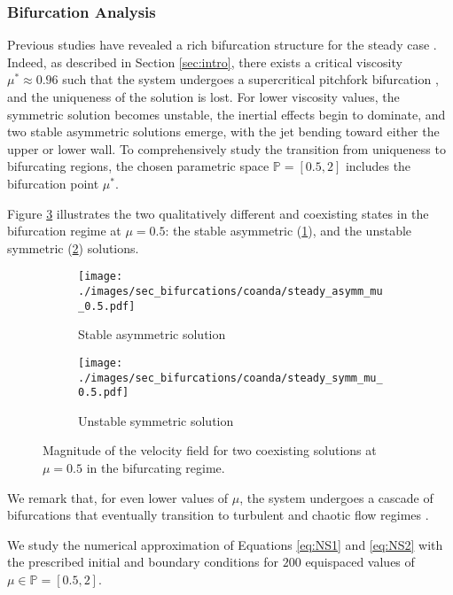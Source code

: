 \documentclass[reqno]{amsart}[standalone]
\theoremstyle{definition}
\theoremstyle{remark}
\begin{document}
\subsubsection{Bifurcation Analysis}
Previous studies have revealed a rich bifurcation structure for the steady case \parencite{QUAINI, pintore_2021}. Indeed, as described in Section \ref{sec:intro}, there exists a critical viscosity $\mu^\ast\approx 0.96$ such that the system undergoes a supercritical pitchfork bifurcation \parencite{PRACTICALBIF}, and the uniqueness of the solution is lost.
%
%
For lower viscosity values, the symmetric solution becomes unstable, the inertial effects begin to dominate, and two stable asymmetric solutions emerge, with the jet bending toward either the upper or lower wall.
To comprehensively study the transition from uniqueness to bifurcating regions, the chosen parametric space $\mathbb{P}=[0.5, 2]$ includes the bifurcation point $\mu^\ast$.

Figure \ref{figWALLHUGGING} illustrates the two qualitatively different and coexisting states in the bifurcation regime at $\mu = 0.5$: the stable asymmetric (\ref{fig:stable_0.5}), and the unstable symmetric (\ref{fig:unstable_0.5}) solutions.

\begin{figure}[ht]
\centering
\begin{subfigure}{0.49\linewidth}
\centering
\texttt{[image: ./images/sec\_bifurcations/coanda/steady\_asymm\_mu\_0.5.pdf]}
\caption{Stable asymmetric solution}
\label{fig:stable_0.5}
\end{subfigure}\hfill
%
\begin{subfigure}{0.49\linewidth}
\centering
\texttt{[image: ./images/sec\_bifurcations/coanda/steady\_symm\_mu\_0.5.pdf]}
\caption{Unstable symmetric solution}
\label{fig:unstable_0.5}
\end{subfigure}
\caption{Magnitude of the velocity field for two coexisting solutions at $\mu=0.5$ in the bifurcating regime.}
\label{figWALLHUGGING}
\end{figure}

%
We remark that, for even lower values of $\mu$, the system undergoes a cascade of bifurcations that eventually transition to turbulent and chaotic flow regimes \parencite{pintore_2021}. %

We study the numerical approximation of Equations \eqref{eq:NS1} and \eqref{eq:NS2} with the prescribed initial and boundary conditions for $200$ equispaced values of $\mu\in\mathbb{P}=[0.5, 2]$.
\end{document}
